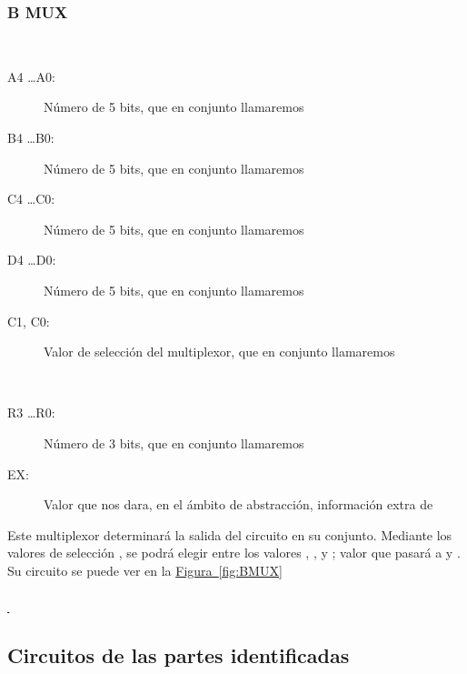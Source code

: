 \documentclass{article}
\newcommand*{\figref}[2][]{
  \hyperref[{fig:#2}]{
    Figura~\ref*{fig:#2}
    \ifx\\#1\\%
    \else
      \,#1
    \fi
  }
}
\begin{document}
\subsubsection{B MUX}
\label{sec:BMUX}
\begin{description}
    \item[Entradas: ] 
    \begin{description}
         \item[A4 \dots A0:] Número de 5 bits, que en conjunto llamaremos 
         \item[B4 \dots B0:] Número de 5 bits, que en conjunto llamaremos 
         \item[C4 \dots C0:] Número de 5 bits, que en conjunto llamaremos 
         \item[D4 \dots D0:] Número de 5 bits, que en conjunto llamaremos 
         \item[C1, C0:] Valor de selección del multiplexor, que en conjunto llamaremos 
    \end{description}
    
    \item[Salidas: ] 
    \begin{description}
        \item[R3 \dots R0:] Número de 3 bits, que en conjunto llamaremos 
        \item[EX: ]Valor que nos dara, en el ámbito de abstracción, información extra de 
    \end{description}
    
    \item[Función: ]Este multiplexor determinará la salida del circuito en su conjunto. Mediante los valores de selección , se podrá elegir entre los valores , ,  y ; valor que pasará a  y . Su circuito se puede ver en la \figref{BMUX}
    
\end{description}
\newpage

\subsection{Circuitos de las partes identificadas} 
\end{document}

